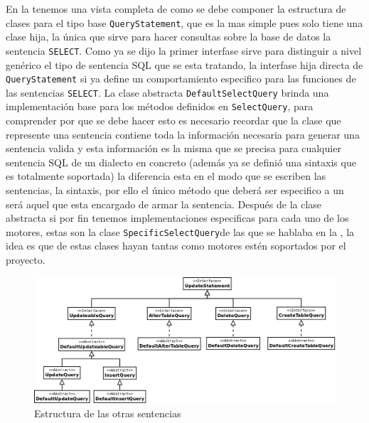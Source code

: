 En la  tenemos una vista completa de como se debe componer la estructura de clases para el tipo base \verb=QueryStatement=, que es la mas simple pues solo tiene una clase hija, la única que sirve para hacer consultas sobre la base de datos la sentencia \verb=SELECT=. Como ya se dijo la primer interfase sirve para distinguir a nivel genérico el tipo de sentencia SQL que se esta tratando, la interfase hija directa de \verb=QueryStatement= si ya define un comportamiento especifico para las funciones de las sentencias \verb=SELECT=. La clase abstracta \verb=DefaultSelectQuery= brinda una implementación base para los métodos definidos en \verb=SelectQuery=, para comprender por que se debe hacer esto es necesario recordar que la clase que represente una sentencia contiene toda la información necesaria para generar una sentencia valida y esta información es la misma que se precisa para cualquier sentencia SQL de un dialecto en concreto (además ya se definió una sintaxis que es totalmente soportada) la diferencia esta en el modo que se escriben las sentencias, la sintaxis, por ello el único método que deberá ser especifico a un \dd será aquel que esta encargado de armar la sentencia. Después de la clase abstracta si por fin tenemos implementaciones especificas para cada uno de los motores, estas son la clase \verb=SpecificSelectQuery=de las que se hablaba en la , la idea es que de estas clases hayan tantas como motores estén soportados por el proyecto.
%
\begin{figure}
  \centering
    \includegraphics[width=\textwidth]{figuras/crossdb-update.png}
  \caption{Estructura de las otras sentencias}
  \label{fig:update}
\end{figure}

